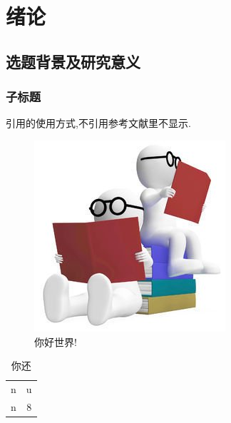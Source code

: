 
\chapter{绪论}

\section{选题背景及研究意义}
 
\subsection{子标题}
引用的使用方式,不引用参考文献里不显示.

\begin{figure}
    \includegraphics[width=.28\textwidth]{figures/figure1}
    \caption{你好世界!}
\end{figure}

\begin{table}
    \begin{tabular}{cc}
    n&u\\
    n&8
    \end{tabular}
    \caption{你还}
\end{table}